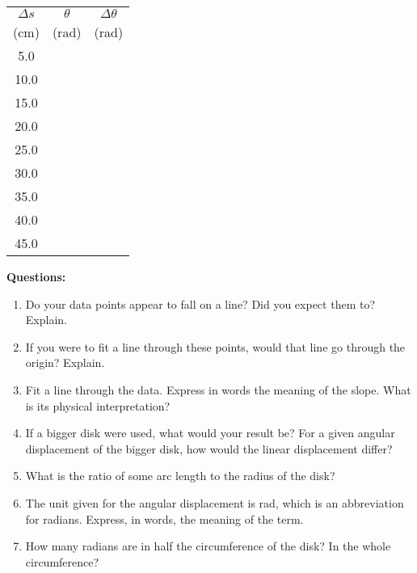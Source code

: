 \begin{center}  \setlength{\unitlength}{1mm} \begin{tabular}{|c|c|c|} \hline $\Delta s$ & $\theta$ & $\Delta\theta$ \\ (cm) & (rad) & (rad) \\ \hline \hline 5.0&& \\ \hline 10.0&& \\ \hline 15.0&& \\ \hline 20.0&& \\ \hline 25.0&& \\ \hline 30.0&& \\ \hline 35.0&& \\ \hline 40.0&& \\ \hline 45.0&& \\ \hline \end{tabular} \end{center}

\smallskip

{\noindent \bf Questions:}

\begin{enumerate}
\item Do your data points appear to fall on a line? Did you expect them to? Explain. \vspace{15mm}

\item If you were to fit a line through these points, would that line go through the
origin? Explain. \vspace{15mm}

\item Fit a line through the data. Express in words the meaning of the slope. What
is its physical interpretation? \vspace{15mm}

\item If a bigger disk were used, what would your result be? For a given angular displacement
of the bigger disk, how would the linear displacement differ? \vspace{15mm}

\item What is the ratio of some arc length to the radius of the disk? \vspace{15mm}

\item The unit given for the angular displacement is rad, which is an abbreviation
for radians. Express, in words, the meaning of the term. \vspace{15mm}

\item How many radians are in half the circumference of the disk? In the whole circumference?
\end{enumerate}
